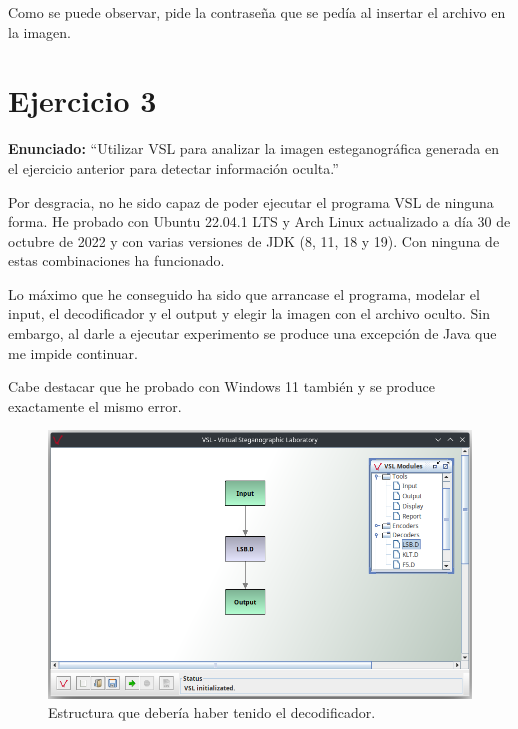 \documentclass{article}
\begin{document}
\bigskip

Como se puede observar, pide la contraseña que se pedía al insertar el archivo en la imagen.

\newpage

\section{Ejercicio 3}

\textbf{Enunciado: }``Utilizar VSL para analizar la imagen esteganográfica generada en el ejercicio anterior para detectar información oculta.''

\bigskip

Por desgracia, no he sido capaz de poder ejecutar el programa VSL de ninguna forma. He probado con Ubuntu 22.04.1 LTS y Arch Linux actualizado a día 30 de octubre de 2022 y con varias versiones de JDK (8, 11, 18 y 19). Con ninguna de estas combinaciones ha funcionado. 

\bigskip

Lo máximo que he conseguido ha sido que arrancase el programa, modelar el input, el decodificador y el output y elegir la imagen con el archivo oculto. Sin embargo, al darle a ejecutar experimento se produce una excepción de Java que me impide continuar.

\bigskip

Cabe destacar que he probado con Windows 11 también y se produce exactamente el mismo error.

\begin{figure}[H]
    \includegraphics[width=\textwidth]{imagenes/Screenshot_20221030_152701.png}
    \caption{Estructura que debería haber tenido el decodificador.}
\end{figure}
\end{document}
